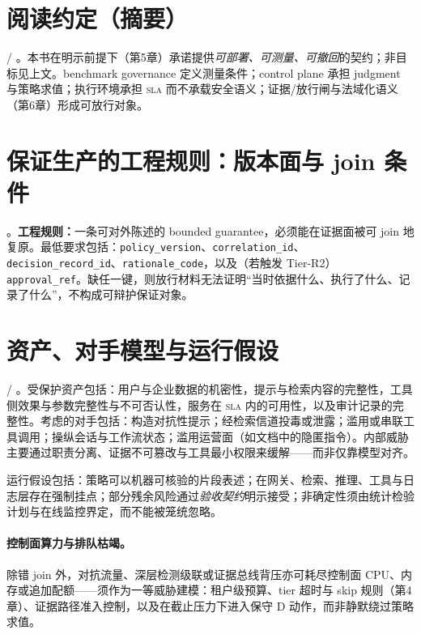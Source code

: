 \documentclass[11pt,a4paper]{report}
\begin{document}
\section{阅读约定（摘要）}
\ControlPlane{} / \EvalFramework{}。本书在明示前提下（第5章）承诺提供\emph{可部署、可测量、可撤回}的契约；非目标见上文。benchmark governance 定义测量条件；control plane 承担 judgment 与策略求值；执行环境承担 \textsc{sla} 而不承载安全语义；证据/放行闸与法域化语义（第6章）形成可放行对象。

\section{保证生产的工程规则：版本面与 join 条件}
\ControlPlane{}。\textbf{工程规则：}一条可对外陈述的 bounded guarantee，必须能在证据面被可 join 地复原。最低要求包括：\texttt{policy\_version}、\texttt{correlation\_id}、\texttt{decision\_record\_id}、\texttt{rationale\_code}，以及（若触发 Tier-R2）\texttt{approval\_ref}。缺任一键，则放行材料无法证明“当时依据什么、执行了什么、记录了什么”，不构成可辩护保证对象。

\section{资产、对手模型与运行假设}
\ControlPlane{} / \EvalFramework{}。受保护资产包括：用户与企业数据的机密性，提示与检索内容的完整性，工具侧效果与参数完整性与不可否认性，服务在 \textsc{sla} 内的可用性，以及审计记录的完整性。考虑的对手包括：构造对抗性提示；经检索信道投毒或泄露；滥用或串联工具调用；操纵会话与工作流状态；滥用运营面（如文档中的隐匿指令）。内部威胁主要通过职责分离、证据不可篡改与工具最小权限来缓解——而非仅靠模型对齐。

运行假设包括：策略可以机器可核验的片段表述；在网关、检索、推理、工具与日志层存在强制挂点；部分残余风险通过\emph{验收契约}明示接受；非确定性须由统计检验计划与在线监控界定，而不能被笼统忽略。

\paragraph{控制面算力与排队枯竭。}除错 join 外，对抗流量、深层检测级联或证据总线背压亦可耗尽控制面 CPU、内存或追加配额——须作为一等威胁建模：租户级预算、tier 超时与 skip 规则（第4章）、证据路径准入控制，以及在截止压力下进入保守 D 动作，而非静默绕过策略求值。
\end{document}
